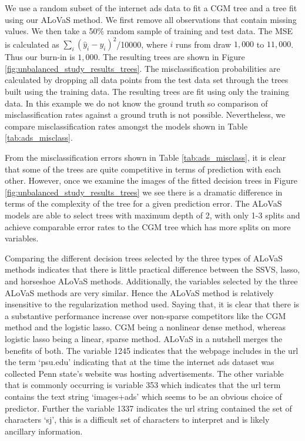 		We use a random subset of the internet ads data to fit a CGM tree and a tree fit using our ALoVaS method. We first remove all observations that contain missing values. We then take a 50\% random sample of training and test data. The MSE is calculated as $\sum_{i}(\hat{y}_{i}-y_i)^{2}$/10000, where $i$ runs from draw $1,000$ to $11,000$. Thus our burn-in is $1,000$. The resulting trees are shown in Figure \ref{fig:unbalanced_study_results_trees}. The misclassification probabilities are calculated by dropping all data points from the test data set through the trees built using the training data. The resulting trees are fit using only the training data.  In this example we do not know the ground truth so comparison of misclassification rates against a ground truth is not possible. Nevertheless, we compare misclassification rates amongst the models shown in Table \ref{tab:ads_misclass}. 
		
		From the misclassification errors shown in Table \ref{tab:ads_misclass}, it is clear that some of the trees are quite competitive in terms of prediction with each other. However, once we examine the images of the fitted decision trees in Figure \ref{fig:unbalanced_study_results_trees} we see there is a dramatic difference in terms of the complexity of the tree for a given prediction error. The ALoVaS models are able to select trees with maximum depth of 2, with only 1-3 splits and achieve comparable error rates to the CGM tree which has more splits on more variables. 
		
		Comparing the different decision trees selected by the three types of ALoVaS methods indicates that there is little practical difference between the SSVS, lasso, and horseshoe ALoVaS methods. Additionally, the variables selected by the three ALoVaS methods are very similar. Hence the ALoVaS method is relatively insensitive to the regularization method used. Saying that, it is clear that there is a substantive performance increase over non-sparse competitors like the CGM method and the logistic lasso. CGM being a nonlinear dense method, whereas logistic lasso being a linear, sparse method. ALoVaS in a nutshell merges the benefits of both. The variable 1245 indicates that the webpage includes in the url the term `psu.edu' indicating that at the time the internet ads dataset was collected Penn state's website was hosting advertisements. The other variable that is commonly occurring is variable 353 which indicates that the url term contains the text string `images+ads' which seems to be an obvious choice of predictor. Further the variable 1337 indicates the url string contained the set of characters `sj', this is a difficult set of characters to interpret and is likely ancillary information. 
		
